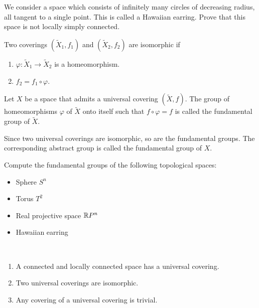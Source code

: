 \begin{ex}\label{Ex:11}
We consider a space which consists of infinitely many circles of decreasing radius, all tangent to a single point. This is called a Hawaiian earring. 
Prove that this space is not locally simply connected.
\end{ex}

 \begin{definition}
Two coverings $(\tilde X_{1},f_{1})$ and $(\tilde X_{2},f_{2})$ are isomorphic if
\begin{enumerate}
\item $\varphi: \tilde X_{1}\to \tilde X_{2}$ is a homeomorphism.
\item $f_{2}= f_{1}\circ \varphi$.
\end{enumerate}
\end{definition}

\begin{definition}
Let $X$ be a space that admits a universal covering $(\tilde X,f)$. The group of homeomorphisms $\varphi$ of $\tilde X$ onto itself such that $f\circ \varphi = f$ is called the fundamental group of $\tilde X$.

Since two universal coverings are isomorphic, so are the fundamental groups. The corresponding abstract group is called the fundamental group of $X$.

\end{definition}
\begin{ex}\label{Ex:12}
Compute the fundamental groups of the following topological spaces:
\begin{itemize}
    \item Sphere $S^n$
    \item Torus $T^2$
    \item Real projective space $\mathbb{R} P^n$
    \item Hawaiian earring
\end{itemize}
\end{ex}
\begin{theorem}
\

\begin{enumerate}
\item A connected and locally connected space has a universal covering.
\item Two universal coverings are isomorphic.
\item Any covering of a universal covering is trivial. \end{enumerate}
\end{theorem}

